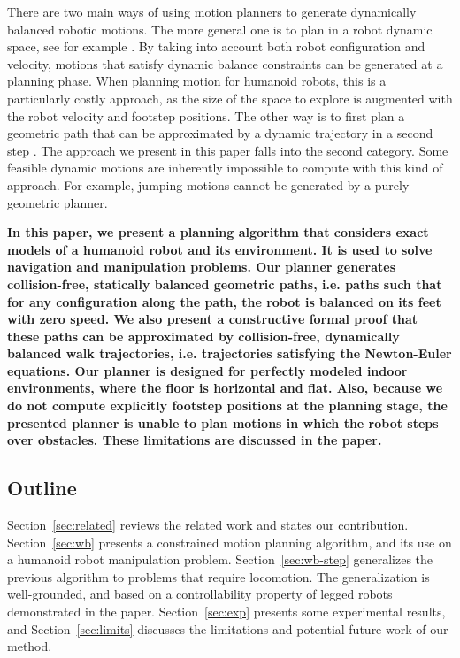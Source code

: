 \documentclass{article}
\begin{document}
There are two main ways of using motion planners to generate dynamically balanced robotic motions.
The more general one is to plan in a robot dynamic space, see for example \cite{shkolnik2011bounding}. 
By taking into account both robot
configuration and velocity, motions that satisfy dynamic balance constraints can be generated
at a planning phase. When planning motion for humanoid robots, this is a particularly costly
approach, as the size of the space to explore is augmented with the robot velocity and footstep
positions. The other way is to first plan  a geometric path that can be approximated by a
dynamic trajectory in a second step \cite{yoshida-humanoids05}. The approach we present in this paper 
falls into the second 
category. Some feasible dynamic motions are inherently impossible to compute with this kind
of approach. For example, jumping motions cannot be generated by a purely geometric planner.

\textbf{In this paper, we present a planning algorithm that considers
  exact models of a humanoid robot and its environment. It is used to
  solve navigation and manipulation problems. Our planner generates
  collision-free, statically balanced geometric paths, i.e. paths such
  that for any configuration along the path, the robot is balanced on
  its feet with zero speed. We also present a constructive formal
  proof that these paths can be approximated by collision-free,
  dynamically balanced walk trajectories, i.e. trajectories satisfying
  the Newton-Euler equations. Our planner is designed for perfectly
  modeled indoor environments, where the floor is horizontal and
  flat. Also, because we do not compute explicitly footstep positions
  at the planning stage, the presented planner is unable to plan
  motions in which the robot steps over obstacles. These limitations
  are discussed in the paper.}


\subsection{Outline}
Section~\ref{sec:related} reviews the related work and states our contribution. 
Section~\ref{sec:wb} presents a constrained motion planning algorithm, and its
use on a humanoid robot manipulation problem. Section~\ref{sec:wb-step} generalizes
the previous algorithm to problems that require locomotion. The generalization is
well-grounded, and
based on a controllability property of legged robots demonstrated in the paper. 
Section~\ref{sec:exp} presents some experimental results, and 
Section~\ref{sec:limits} discusses the limitations and potential future work of our
method.
\end{document}
